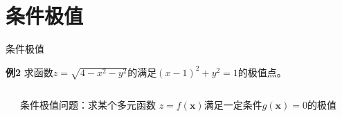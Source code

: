 \section{条件极值}

\begin{frame}{条件极值}
	\linespread{1.2}\pause 
	\begin{exampleblock}{{\bf 例2}\hfill}
		求函数$z=\sqrt{4-x^2-y^2}$的满足$(x-1)^2+y^2=1$的极值点。\pause 
	\end{exampleblock}
	\begin{columns}
			\begin{center}
				\pause 
			\end{center}
			{\bb 条件极值问题：}\pause \alert{求某个多元函数
			$z=f(\bm{x})$满足一定条件$g(\bm{x})=0$的极值}
	\end{columns}
\end{frame}

